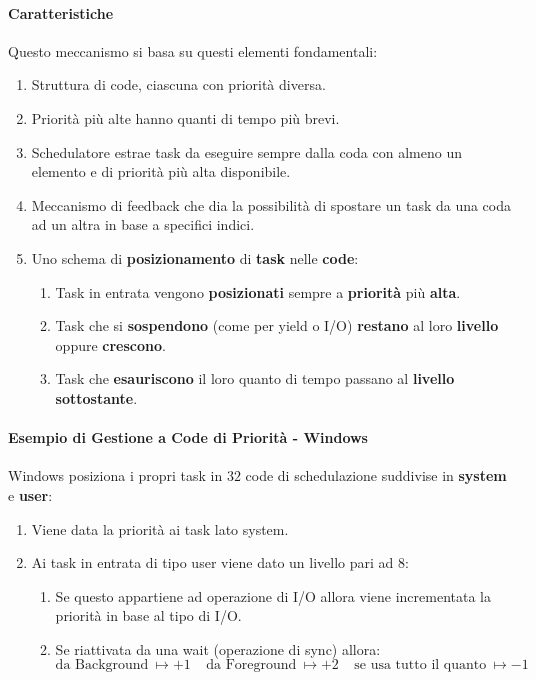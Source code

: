 \documentclass{article}
\begin{document}
\paragraph{Caratteristiche} Questo meccanismo si basa su questi elementi fondamentali:

\begin{enumerate}
    \item Struttura di code, ciascuna con priorità diversa.
    \item Priorità più alte hanno quanti di tempo più brevi.
    \item Schedulatore estrae task da eseguire sempre dalla coda con almeno un elemento e di priorità più alta disponibile.
    \item Meccanismo di feedback che dia la possibilità di spostare un task da una coda ad un altra in base a specifici indici.
    \item Uno schema di \textbf{posizionamento} di \textbf{task} nelle \textbf{code}:
    \begin{enumerate}
        \item Task in entrata vengono \textbf{posizionati} sempre a \textbf{priorità} più \textbf{alta}.
        \item Task che si \textbf{sospendono} (come per yield o I/O) \textbf{restano} al loro \textbf{livello} oppure \textbf{crescono}.
        \item Task che \textbf{esauriscono} il loro quanto di tempo passano al \textbf{livello sottostante}.
    \end{enumerate}
\end{enumerate}

\paragraph{Esempio di Gestione a Code di Priorità - Windows}

Windows posiziona i propri task in $32$ code di schedulazione suddivise in \textbf{system} e \textbf{user}:

\begin{enumerate}
    \item Viene data la priorità ai task lato system.
    \item Ai task in entrata di tipo user viene dato un livello pari ad $8$:
    \begin{enumerate}
        \item Se questo appartiene ad operazione di I/O allora viene incrementata la priorità in base al tipo di I/O.
        \item Se riattivata da una wait (operazione di sync) allora:
        \[ \text{da Background} \: \mapsto +1 \:\:\:\:\: \text{da Foreground} \: \mapsto +2 \:\:\:\:\: \text{se usa tutto il quanto} \: \mapsto -1 \]
    \end{enumerate}
\end{enumerate}
\end{document}
